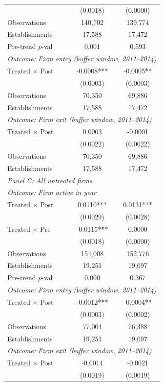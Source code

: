 \begin{table}[H]
\begin{tabular}{lcc}
& (0.0018) & (0.0000) \\[3pt]
Observations   & 140,702 & 139,774 \\
Establishments & 17,588 & 17,472 \\
Pre-trend $p$-val & 0.001 & 0.593 \\
\midrule
\multicolumn{3}{l}{\textit{Outcome: Firm entry (buffer window, 2011--2014)}} \\
Treated $\times$ Post & -0.0008*** & -0.0005** \\
& (0.0003) & (0.0003) \\[3pt]
Observations   & 70,350 & 69,886 \\
Establishments & 17,588 & 17,472 \\
\midrule
\multicolumn{3}{l}{\textit{Outcome: Firm exit (buffer window, 2011--2014)}} \\
Treated $\times$ Post & 0.0003 & -0.0001 \\
& (0.0022) & (0.0022) \\[3pt]
Observations   & 70,350 & 69,886 \\
Establishments & 17,588 & 17,472 \\
\midrule
\multicolumn{3}{l}{\textit{Panel C: All untreated firms}} \\
\midrule
\multicolumn{3}{l}{\textit{Outcome: Firm active in year}} \\
Treated $\times$ Post & 0.0110*** & 0.0131*** \\
& (0.0029) & (0.0028) \\[3pt]
Treated $\times$ Pre & -0.0115*** & 0.0000 \\
& (0.0018) & (0.0000) \\[3pt]
Observations   & 154,008 & 152,776 \\
Establishments & 19,251 & 19,097 \\
Pre-trend $p$-val & 0.000 & 0.367 \\
\midrule
\multicolumn{3}{l}{\textit{Outcome: Firm entry (buffer window, 2011--2014)}} \\
Treated $\times$ Post & -0.0012*** & -0.0004** \\
& (0.0003) & (0.0002) \\[3pt]
Observations   & 77,004 & 76,388 \\
Establishments & 19,251 & 19,097 \\
\midrule
\multicolumn{3}{l}{\textit{Outcome: Firm exit (buffer window, 2011--2014)}} \\
Treated $\times$ Post & -0.0014 & -0.0021 \\
& (0.0019) & (0.0019) \\[3pt]

\end{tabular}
\end{table}
